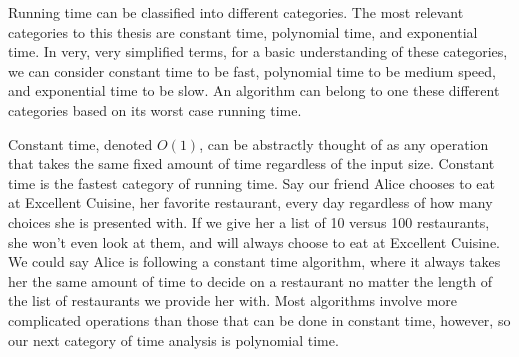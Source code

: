 Running time can be classified into different categories. The most
relevant categories to this thesis are constant time, polynomial time, and
exponential time. In very, very simplified terms, for a basic understanding of
these categories, we can consider constant time to be fast, polynomial time to
be medium speed, and exponential time to be slow. An algorithm can belong to one
these different categories based on its worst case running time. 

Constant time, denoted $O(1)$, can be abstractly thought of as any
operation that takes the same fixed amount of time regardless of the input size.
Constant time is the fastest category of running time. Say our friend Alice
chooses to eat at Excellent Cuisine, her favorite restaurant, every day regardless of how many choices
she is presented with. If we give her a list of 10 versus 100 restaurants, she
won't even look at them, and will always choose to eat at Excellent Cuisine. We
could say Alice is following a constant time algorithm, where it always takes
her the same amount of time to decide on a restaurant no matter the length of
the list of restaurants we provide her with. Most algorithms
involve more complicated operations than those that can be done in constant
time, however, so our next category of time analysis is polynomial time.

